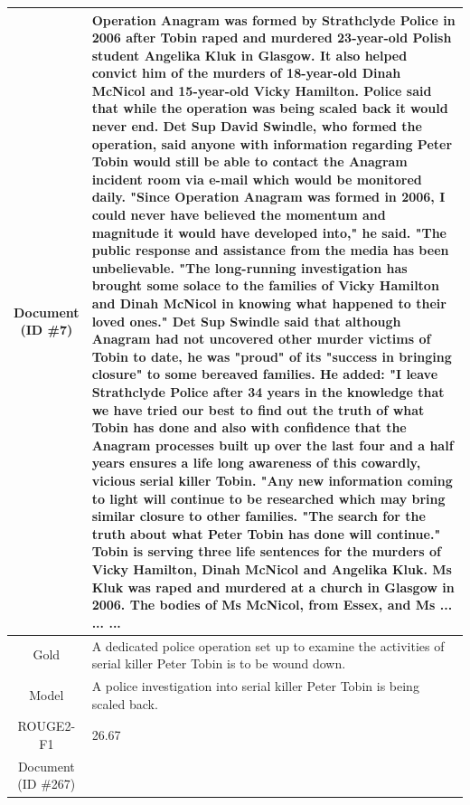 \begin{table}[bth!]
\begin{tabular}{c|p{}}
\makecell{Document\\(ID \#7)} & 
Operation Anagram was formed by Strathclyde Police in 2006 after Tobin raped and murdered 23-year-old Polish student Angelika Kluk in Glasgow. It also helped convict him of the murders of 18-year-old Dinah McNicol and 15-year-old Vicky Hamilton. Police said that while the operation was being scaled back it would never end. Det Sup David Swindle, who formed the operation, said anyone with information regarding Peter Tobin would still be able to contact the Anagram incident room via e-mail which would be monitored daily. "Since Operation Anagram was formed in 2006, I could never have believed the momentum and magnitude it would have developed into," he said. "The public response and assistance from the media has been unbelievable. "The long-running investigation has brought some solace to the families of Vicky Hamilton and Dinah McNicol in knowing what happened to their loved ones." Det Sup Swindle said that although Anagram had not uncovered other murder victims of Tobin to date, he was "proud" of its "success in bringing closure" to some bereaved families. He added: "I leave Strathclyde Police after 34 years in the knowledge that we have tried our best to find out the truth of what Tobin has done and also with confidence that the Anagram processes built up over the last four and a half years ensures a life long awareness of this cowardly, vicious serial killer Tobin. "Any new information coming to light will continue to be researched which may bring similar closure to other families. "The search for the truth about what Peter Tobin has done will continue." Tobin is serving three life sentences for the murders of Vicky Hamilton, Dinah McNicol and Angelika Kluk. Ms Kluk was raped and murdered at a church in Glasgow in 2006. The bodies of Ms McNicol, from Essex, and Ms ... ... ... 
\\ \hline
Gold & 
A dedicated police operation set up to examine the activities of serial killer Peter Tobin is to be wound down.
\\ \hline
Model & 
A police investigation into serial killer Peter Tobin is being scaled back.
\\ \hline
ROUGE2-F1 & 
26.67
\\ \hline
\makecell{Document\\(ID \#267)} & 

\end{tabular}
\end{table}
